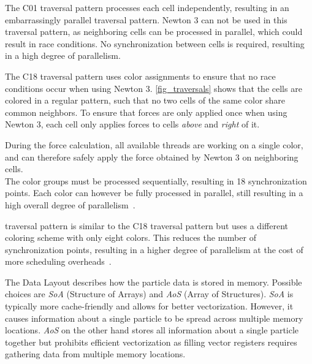 \documentclass[conference]{IEEEtran}
\begin{document}
\begin{description}[style=nextline]
        \begin{description}[style=nextline, font=\itshape\mdseries]
            \item[C01]
                The C01 traversal pattern processes each cell independently, resulting in an embarrassingly parallel traversal pattern. Newton 3 can not be used in this traversal pattern, as neighboring cells can be processed in parallel, which could result in race conditions. No synchronization between cells is required, resulting in a high degree of parallelism.
            \item[C18]
                The C18 traversal pattern uses color assignments to ensure that no race conditions occur when using Newton 3. \autoref{fig_traversals} shows that the cells are colored in a regular pattern, such that no two cells of the same color share common neighbors. To ensure that forces are only applied once when using Newton 3, each cell only applies forces to cells \textit{above} and \textit{right} of it.

                During the force calculation, all available threads are working on a single color, and can therefore safely apply the force obtained by Newton 3 on neighboring cells. \\
                The color groups must be processed sequentially, resulting in 18 synchronization points. Each color can however be fully processed in parallel, still resulting in a high overall degree of parallelism~\cite{NEWCOME2023115278}.
            \item[C08]
                traversal pattern is similar to the C18 traversal pattern but uses a different coloring scheme with only eight colors. This reduces the number of synchronization points, resulting in a higher degree of parallelism at the cost of more scheduling overheads~\cite{NEWCOME2023115278}.
        \end{description}

    \item[Data Layout]
        The Data Layout describes how the particle data is stored in memory. Possible choices are \textit{SoA} (Structure of Arrays) and \textit{AoS} (Array of Structures). \textit{SoA} is typically more cache-friendly and allows for better vectorization. However, it causes information about a single particle to be spread across multiple memory locations. \textit{AoS} on the other hand stores all information about a single particle together but prohibits efficient vectorization as filling vector registers requires gathering data from multiple memory locations.
\end{description}
\end{document}
